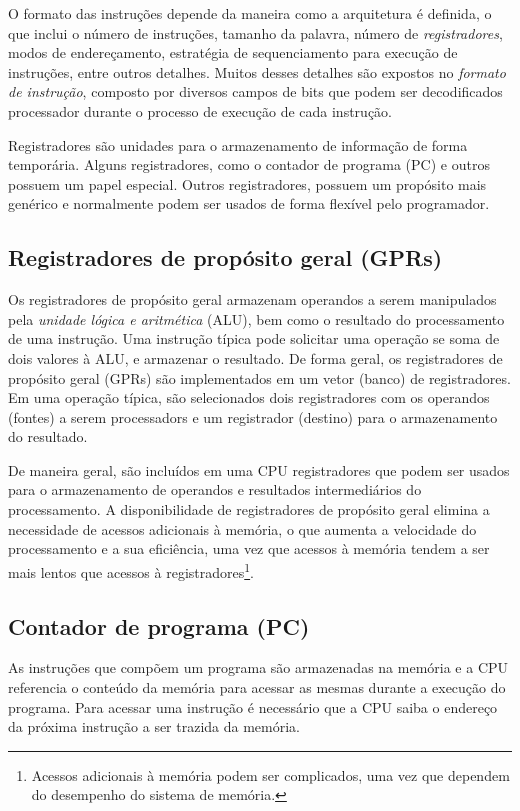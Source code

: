 \documentclass[11pt,a4paper]{report}
\begin{document}
O formato das instruções depende da maneira como a arquitetura é definida,
o que inclui o número de instruções, tamanho da palavra, número de
\textit{registradores}, modos de endereçamento, estratégia de
sequenciamento para execução de instruções, entre outros detalhes. Muitos
desses detalhes são expostos no \textit{formato de instrução}, composto
por diversos campos de bits que podem ser decodificados processador
durante o processo de execução de cada instrução.

Registradores são unidades para o armazenamento de informação de forma
temporária. Alguns registradores, como o contador de programa (PC) e
outros possuem um papel especial. Outros registradores, possuem um
propósito mais genérico e normalmente podem ser usados de forma flexível
pelo programador.

\subsection{Registradores de propósito geral (GPRs)}

Os registradores de propósito geral armazenam operandos a serem manipulados
pela \textit{unidade lógica e aritmética} (ALU), bem como o resultado
do processamento de uma instrução. Uma instrução típica pode solicitar
uma operação se soma de dois valores à ALU, e armazenar o resultado. De
forma geral, os registradores de propósito geral (GPRs) são implementados
em um vetor (banco) de registradores. Em uma operação típica, são
selecionados dois registradores com os operandos (fontes) a serem 
processadors e um registrador (destino) para o armazenamento do resultado.

De maneira geral, são incluídos em uma CPU registradores que podem ser
usados para o armazenamento de operandos e resultados intermediários
do processamento. A disponibilidade de registradores de propósito geral
elimina a necessidade de acessos adicionais à memória, o que aumenta
a velocidade do processamento e a sua eficiência, uma vez que acessos
à memória tendem a ser mais lentos que acessos à registradores\footnote{
Acessos adicionais à memória podem ser complicados, uma vez que dependem
do desempenho do sistema de memória.}.

\subsection{Contador de programa (PC)}

As instruções que compõem um programa são armazenadas na memória e a CPU
referencia o conteúdo da memória para acessar as mesmas durante a execução
do programa. Para acessar uma instrução é necessário que a CPU saiba o
endereço da próxima instrução a ser trazida da memória.
\end{document}
